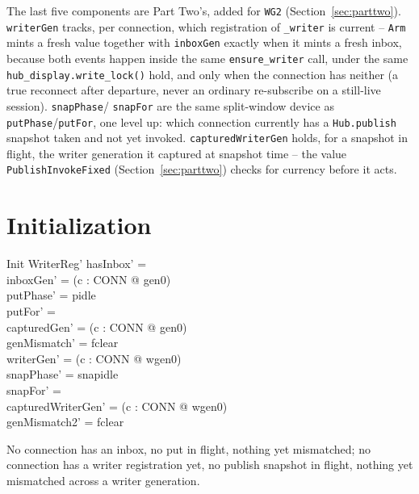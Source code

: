 \documentclass[a4paper,10pt,fleqn]{article}
\begin{document}
The last five components are Part Two's, added for \texttt{WG2}
(Section~\ref{sec:parttwo}). \texttt{writerGen} tracks, per connection,
which registration of \texttt{\_writer} is current -- \texttt{Arm} mints a
fresh value together with \texttt{inboxGen} exactly when it mints a fresh
inbox, because both events happen inside the same \texttt{ensure\_writer}
call, under the same \texttt{hub\_display.write\_lock()} hold, and only when
the connection has neither (a true reconnect after departure, never an
ordinary re-subscribe on a still-live session). \texttt{snapPhase}/
\texttt{snapFor} are the same split-window device as
\texttt{putPhase}/\texttt{putFor}, one level up: which connection currently
has a \texttt{Hub.publish} snapshot taken and not yet invoked.
\texttt{capturedWriterGen} holds, for a snapshot in flight, the writer
generation it captured at snapshot time -- the value \texttt{PublishInvokeFixed}
(Section~\ref{sec:parttwo}) checks for currency before it acts.

\section{Initialization}

\begin{schema}{Init}
  WriterReg'
\where
  hasInbox' = \emptyset \\
  inboxGen' = (\lambda c : CONN @ gen0) \\
  putPhase' = pidle \\
  putFor' = \emptyset \\
  capturedGen' = (\lambda c : CONN @ gen0) \\
  genMismatch' = fclear \\
  writerGen' = (\lambda c : CONN @ wgen0) \\
  snapPhase' = snapidle \\
  snapFor' = \emptyset \\
  capturedWriterGen' = (\lambda c : CONN @ wgen0) \\
  genMismatch2' = fclear
\end{schema}

No connection has an inbox, no put in flight, nothing yet mismatched; no
connection has a writer registration yet, no publish snapshot in flight,
nothing yet mismatched across a writer generation.

\end{document}
